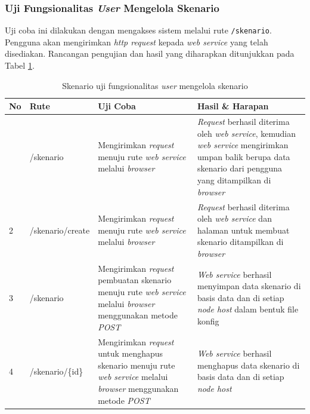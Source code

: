 		\subsubsection{Uji Fungsionalitas \textit{User} Mengelola Skenario}
			Uji coba ini dilakukan dengan mengakses sistem melalui rute \texttt{/skenario}. Pengguna akan mengirimkan \textit{http request} kepada \textit{web service} yang telah disediakan. Rancangan pengujian dan hasil yang diharapkan ditunjukkan pada Tabel \ref{tabelujiskenario}.
			\begin{longtable}{|p{}|p{}|p{0.30\textwidth}|p{}|}
				\caption{Skenario uji fungsionalitas \textit{user} mengelola skenario} \label{tabelujiskenario} \\ \hline
				\textbf{No} & \textbf{Rute} & \textbf{Uji Coba} & \textbf{Hasil \& Harapan} \\ \hline
				\endhead
				\endfoot
				\endlastfoot
				1 & /skenario & Mengirimkan \textit{request} menuju rute \textit{web service} melalui \textit{browser} & \textit{Request} berhasil diterima oleh \textit{web service}, kemudian \textit{web service} mengirimkan umpan balik berupa data skenario dari pengguna yang ditampilkan di \textit{browser} \\ \hline
				2 & /skenario/create & Mengirimkan \textit{request} menuju rute \textit{web service} melalui \textit{browser} & \textit{Request} berhasil diterima oleh \textit{web service} dan halaman untuk membuat skenario ditampilkan di \textit{browser} \\ \hline
				3 & /skenario & Mengirimkan \textit{request} pembuatan skenario menuju rute \textit{web service} melalui \textit{browser} menggunakan metode \textit{POST} & \textit{Web service} berhasil menyimpan data skenario di basis data dan di setiap \textit{node host} dalam bentuk file konfig \\ \hline
				4 & /skenario/\{id\} & Mengirimkan \textit{request} untuk menghapus skenario menuju rute \textit{web service} melalui \textit{browser} menggunakan metode \textit{POST} & \textit{Web service} berhasil menghapus data skenario di basis data dan di setiap \textit{node host} \\ \hline
			\end{longtable}
		
